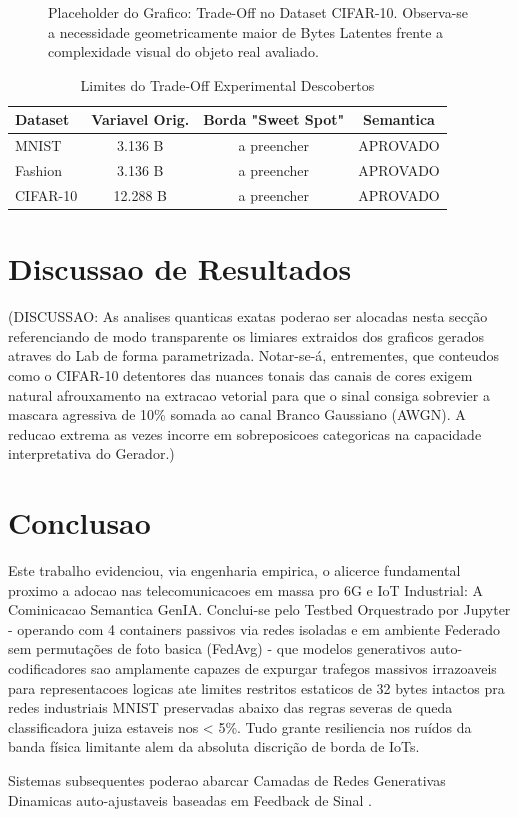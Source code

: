 \documentclass[conference]{IEEEtran}
\begin{document}
\begin{figure}[ht]
\centering
\caption{Placeholder do Grafico: Trade-Off no Dataset CIFAR-10. Observa-se a necessidade geometricamente maior de Bytes Latentes frente a complexidade visual do objeto real avaliado.}
\label{fig:tradeoff_cifar10}
\end{figure}

\begin{table}[ht]
\centering
\caption{Limites do Trade-Off Experimental Descobertos}
\label{tab:params}
\begin{tabular}{lccc}
\toprule
\textbf{Dataset} & \textbf{Variavel Orig.} & \textbf{Borda "Sweet Spot"} & \textbf{Semantica} \\
\midrule
MNIST & 3.136 B & a preencher & APROVADO \\
Fashion & 3.136 B & a preencher & APROVADO \\
CIFAR-10 & 12.288 B & a preencher & APROVADO \\
\bottomrule
\end{tabular}
\end{table}


\section{Discussao de Resultados}

(DISCUSSAO: As analises quanticas exatas poderao ser alocadas nesta secção referenciando de modo transparente os limiares extraidos dos graficos gerados atraves do Lab de forma parametrizada. 
Notar-se-á, entrementes, que conteudos como o CIFAR-10 detentores das nuances tonais das canais de cores exigem natural afrouxamento na extracao vetorial para que o sinal consiga sobrevier a mascara agressiva de 10\% somada ao canal Branco Gaussiano (AWGN). A reducao extrema as vezes incorre em sobreposicoes categoricas na capacidade interpretativa do Gerador.)


\section{Conclusao}

Este trabalho evidenciou, via engenharia empirica, o alicerce fundamental proximo a adocao nas telecomunicacoes em massa pro 6G e IoT Industrial: A Cominicacao Semantica GenIA.
Conclui-se pelo Testbed Orquestrado por Jupyter - operando com 4 containers passivos via redes isoladas e em ambiente Federado sem permutações de foto basica (FedAvg) - que modelos generativos auto-codificadores sao amplamente capazes de expurgar trafegos massivos irrazoaveis para representacoes logicas ate limites restritos estaticos de 32 bytes intactos pra redes industriais MNIST preservadas abaixo das regras severas de queda classificadora juiza estaveis nos < 5\%.
Tudo grante resiliencia nos ruídos da banda física limitante alem da absoluta discrição de borda de IoTs.

Sistemas subsequentes poderao abarcar Camadas de Redes Generativas Dinamicas auto-ajustaveis baseadas em Feedback de Sinal \cite{xia2023gennet_layer}.



\end{document}
